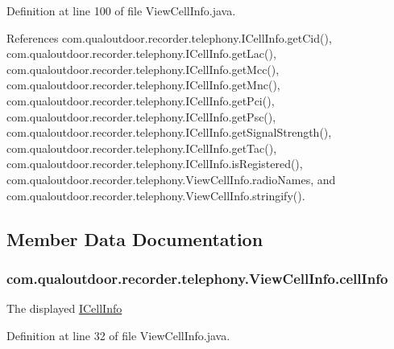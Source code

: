 Definition at line 100 of file View\-Cell\-Info.\-java.



References com.\-qualoutdoor.\-recorder.\-telephony.\-I\-Cell\-Info.\-get\-Cid(), com.\-qualoutdoor.\-recorder.\-telephony.\-I\-Cell\-Info.\-get\-Lac(), com.\-qualoutdoor.\-recorder.\-telephony.\-I\-Cell\-Info.\-get\-Mcc(), com.\-qualoutdoor.\-recorder.\-telephony.\-I\-Cell\-Info.\-get\-Mnc(), com.\-qualoutdoor.\-recorder.\-telephony.\-I\-Cell\-Info.\-get\-Pci(), com.\-qualoutdoor.\-recorder.\-telephony.\-I\-Cell\-Info.\-get\-Psc(), com.\-qualoutdoor.\-recorder.\-telephony.\-I\-Cell\-Info.\-get\-Signal\-Strength(), com.\-qualoutdoor.\-recorder.\-telephony.\-I\-Cell\-Info.\-get\-Tac(), com.\-qualoutdoor.\-recorder.\-telephony.\-I\-Cell\-Info.\-is\-Registered(), com.\-qualoutdoor.\-recorder.\-telephony.\-View\-Cell\-Info.\-radio\-Names, and com.\-qualoutdoor.\-recorder.\-telephony.\-View\-Cell\-Info.\-stringify().



\subsection{Member Data Documentation}
\hypertarget{classcom_1_1qualoutdoor_1_1recorder_1_1telephony_1_1ViewCellInfo_af66b5ef483daa533f30f2ee851700656}{
\subsubsection[{cell\-Info}]{ com.\-qualoutdoor.\-recorder.\-telephony.\-View\-Cell\-Info.\-cell\-Info\hspace{0.3cm}{\ttfamily [private]}}}\label{classcom_1_1qualoutdoor_1_1recorder_1_1telephony_1_1ViewCellInfo_af66b5ef483daa533f30f2ee851700656}
The displayed \hyperlink{interfacecom_1_1qualoutdoor_1_1recorder_1_1telephony_1_1ICellInfo}{I\-Cell\-Info} 

Definition at line 32 of file View\-Cell\-Info.\-java.

